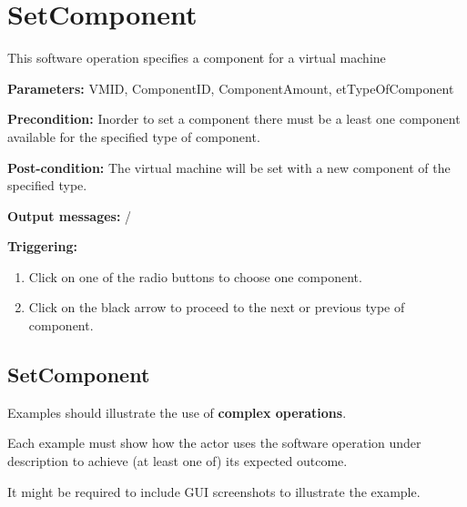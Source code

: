 \section{SetComponent}
\label{operation:SetComponent}
This software operation specifies a component for a virtual machine
\begin{description}

\item \textbf{Parameters:} VMID, ComponentID, ComponentAmount,
etTypeOfComponent
\item \textbf{Precondition:} Inorder to set a component there must be a least
one component available for the specified type of component.
\item \textbf{Post-condition:} The virtual machine will be set with a new
component of the specified type.
\item \textbf{Output messages:} /

\item \textbf{Triggering:}
\begin{enumerate}
\item Click on one of the radio buttons to choose one component.
\item Click on the black arrow to proceed to the next or previous type of
component.
\end{enumerate}

 
\end{description}

 
\subsection{SetComponent}
Examples should illustrate the use of \textbf{complex operations}.

Each example must show how the actor uses the software operation under
description to achieve (at least one of) its expected outcome.

It might be required to include GUI screenshots to illustrate the example.












